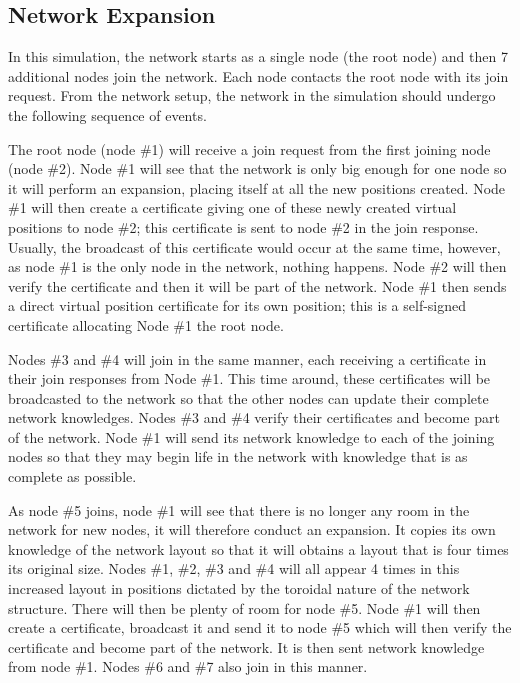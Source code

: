 \documentclass[ %
                    author={Luke Murray},
                supervisor={Dr. Simon Hollis},
                     title={Shadow Peer-to-Peer Networks},
                  subtitle={},
                    degree={MEng},
                      year={2013} ]{thesis}
\begin{document}
\subsection{Network Expansion}

In this simulation, the network starts as a single node (the root node) and then 7 additional nodes join the network. Each node contacts the root node with its join request. From the network setup, the network in the simulation should undergo the following sequence of events.

The root node (node \#1) will receive a join request from the first joining node (node \#2). Node \#1 will see that the network is only big enough for one node so it will perform an expansion, placing itself at all the new positions created. Node \#1 will then create a certificate giving one of these newly created virtual positions to node \#2; this certificate is sent to node \#2 in the join response. Usually, the broadcast of this certificate would occur at the same time, however, as node \#1 is the only node in the network, nothing happens. Node \#2 will then verify the certificate and then it will be part of the network. Node \#1 then sends a direct virtual position certificate for its own position; this is a self-signed certificate allocating Node \#1 the root node.

Nodes \#3 and \#4 will join in the same manner, each receiving a certificate in their join responses from Node \#1. This time around, these certificates will be broadcasted to the network so that the other nodes can update their complete network knowledges. Nodes \#3 and \#4 verify their certificates and become part of the network. Node \#1 will send its network knowledge to each of the joining nodes so that they may begin life in the network with knowledge that is as complete as possible.

As node \#5 joins, node \#1 will see that there is no longer any room in the network for new nodes, it will therefore conduct an expansion. It copies its own knowledge of the network layout so that it will obtains a layout that is four times its original size. Nodes \#1, \#2, \#3 and \#4 will all appear 4 times in this increased layout in positions dictated by the toroidal nature of the network structure. There will then be plenty of room for node \#5. Node \#1 will then create a certificate, broadcast it and send it to node \#5 which will then verify the certificate and become part of the network. It is then sent network knowledge from node \#1. Nodes \#6 and \#7 also join in this manner.
\end{document}
